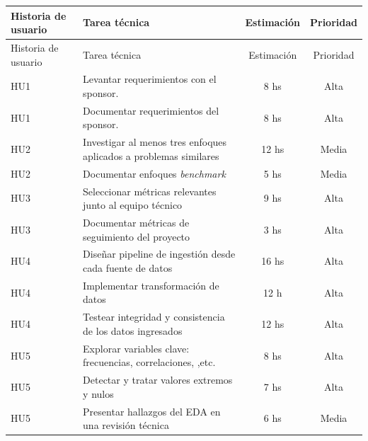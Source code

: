 \documentclass[
11pt, %
]{charter}
\begin{document}
\begin{longtable}{|p{2cm}|p{10cm}|c|c|}
\hline
\rowcolor[HTML]{C0C0C0}
Historia de usuario & Tarea técnica & Estimación & Prioridad \\ \hline
\endfirsthead

\hline
\rowcolor[HTML]{C0C0C0}
Historia de usuario & Tarea técnica & Estimación & Prioridad \\ \hline
\endhead

HU1 & Levantar requerimientos con el sponsor. & 8 hs & Alta \\ \hline
HU1 & Documentar requerimientos del sponsor. & 8 hs & Alta \\ \hline

HU2 & Investigar al menos tres enfoques aplicados a problemas similares & 12 hs & Media \\ \hline
HU2 & Documentar enfoques \textit{benchmark} & 5 hs & Media \\ \hline

HU3 & Seleccionar métricas relevantes junto al equipo técnico & 9 hs & Alta \\ \hline
HU3 & Documentar métricas de seguimiento del proyecto  & 3 hs & Alta \\ \hline

HU4 & Diseñar pipeline de ingestión desde cada fuente de datos & 16 hs & Alta \\ \hline
HU4 & Implementar transformación de datos  & 12 h & Alta \\ \hline
HU4 & Testear integridad y consistencia de los datos ingresados & 12 hs & Alta \\ \hline

HU5 & Explorar variables clave: frecuencias, correlaciones, ,etc. & 8 hs & Alta \\ \hline
HU5 & Detectar y tratar valores extremos y nulos & 7 hs & Alta \\ \hline
HU5 & Presentar hallazgos del EDA en una revisión técnica & 6 hs & Media \\ \hline


\end{longtable}
\end{document}
